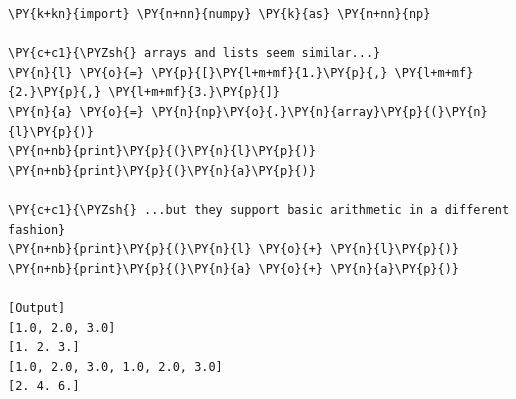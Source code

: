 \begin{Verbatim}[label=\makebox{\url{https://github.com/lucabaldini/cmepda/tree/master/slides/latex/snippets/numpy\_arrays\_vs\_lists.py}},commandchars=\\\{\}]
\PY{k+kn}{import} \PY{n+nn}{numpy} \PY{k}{as} \PY{n+nn}{np}

\PY{c+c1}{\PYZsh{} arrays and lists seem similar...}
\PY{n}{l} \PY{o}{=} \PY{p}{[}\PY{l+m+mf}{1.}\PY{p}{,} \PY{l+m+mf}{2.}\PY{p}{,} \PY{l+m+mf}{3.}\PY{p}{]}
\PY{n}{a} \PY{o}{=} \PY{n}{np}\PY{o}{.}\PY{n}{array}\PY{p}{(}\PY{n}{l}\PY{p}{)}
\PY{n+nb}{print}\PY{p}{(}\PY{n}{l}\PY{p}{)}
\PY{n+nb}{print}\PY{p}{(}\PY{n}{a}\PY{p}{)}

\PY{c+c1}{\PYZsh{} ...but they support basic arithmetic in a different fashion}
\PY{n+nb}{print}\PY{p}{(}\PY{n}{l} \PY{o}{+} \PY{n}{l}\PY{p}{)}
\PY{n+nb}{print}\PY{p}{(}\PY{n}{a} \PY{o}{+} \PY{n}{a}\PY{p}{)}

[Output]
[1.0, 2.0, 3.0]
[1. 2. 3.]
[1.0, 2.0, 3.0, 1.0, 2.0, 3.0]
[2. 4. 6.]
\end{Verbatim}